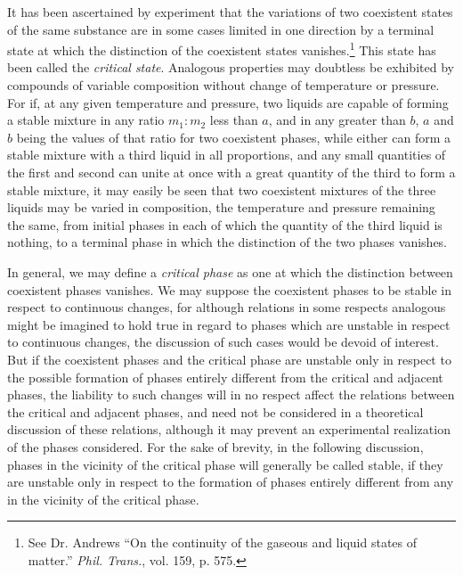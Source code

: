 \documentclass[11pt]{article}
\newcommand{\symfootnote}[2]{\begingroup\renewcommand{\thefootnote}{#1}\footnote{#2}\endgroup}
\begin{document}
It has been ascertained by experiment that the variations of two coexistent states of the same substance are in some cases limited in one direction by a terminal state at which the distinction of the coexistent states vanishes.\symfootnote{*}{See Dr. Andrews ``On the continuity of the gaseous and liquid states of matter.'' \textit{Phil. Trans.}, vol. 159, p. 575.} This state has been called the \textit{critical state}. Analogous properties may doubtless be exhibited by compounds of variable composition without change of temperature or pressure. For if, at any given temperature and pressure, two liquids are capable of forming a stable mixture in any ratio $m_1:m_2$ less than $a$, and in any greater than $b$, $a$ and $b$ being the values of that ratio for two coexistent phases, while either can form a stable mixture with a third liquid in all proportions, and any small quantities of the first and second can unite at once with a great quantity of the third to form a stable mixture, it may easily be seen that two coexistent mixtures of the three liquids may be varied in composition, the temperature and pressure remaining the same, from initial phases in each of which the quantity of the third liquid is nothing, to a terminal phase in which the distinction of the two phases vanishes.

In general, we may define a \textit{critical phase} as one at which the distinction between coexistent phases vanishes. We may suppose the coexistent phases to be stable in respect to continuous changes, for although relations in some respects analogous might be imagined to hold true in regard to phases which are unstable in respect to continuous changes, the discussion of such cases would be devoid of interest. But if the coexistent phases and the critical phase are unstable only in respect to the possible formation of phases entirely different from the critical and adjacent phases, the liability to such changes will in no respect affect the relations between the critical and adjacent phases, and need not be considered in a theoretical discussion of these relations, although it may prevent an experimental realization of the phases considered. For the sake of brevity, in the following discussion, phases in the vicinity of the critical phase will generally be called stable, if they are unstable only in respect to the formation of phases entirely different from any in the vicinity of the critical phase.
\end{document}
